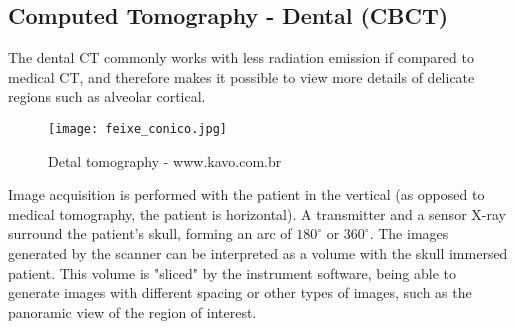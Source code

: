 \subsection{Computed Tomography - Dental (CBCT)}


The dental CT commonly works with less radiation emission if compared to medical CT, and therefore makes it possible to view more details of delicate regions such as alveolar cortical.

\begin{figure}[!htb]
\centering
\texttt{[image: feixe\_conico.jpg]}
\caption{Detal tomography - www.kavo.com.br}
\end{figure}


Image acquisition is performed with the patient in the vertical (as opposed to medical tomography, the patient is horizontal). A transmitter and a sensor X-ray surround the patient's skull, forming an arc of $180^\circ$ or $360^\circ$. The images generated by the scanner can be interpreted as a volume with the skull immersed patient. This volume is "sliced" by the instrument software, being able to generate images with different spacing or other types of images, such as the panoramic view of the region of interest.


